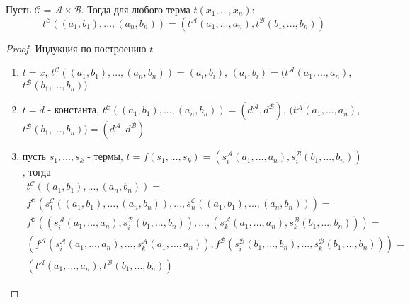 \documentclass[../main/document.tex]{subfiles}
\begin{document}
\begin{lemma}
Пусть $\mathcal{C}= \mathcal{A}\times\mathcal{B}$. Тогда для любого терма $t(x_1,...,x_n)$:
$$t^{\mathcal{C}}((a_1,b_1),...,(a_n,b_n))=(t^{\mathcal{A}}(a_1,...,a_n),t^{\mathcal{B}}(b_1,...,b_n))$$
\begin{proof}
Индукция по построению $t$
\begin{enumerate}
\item $t=x$, $t^{\mathcal{C}}((a_1,b_1),...,(a_n,b_n))=(a_i,b_i)$, $(a_i,b_i)=(t^{\mathcal{A}}(a_1,...,a_n)$, $t^{\mathcal{B}}(b_1,...,b_n))$
\item $t=d$ - константа, $t^{\mathcal{C}}((a_1,b_1),...,(a_n,b_n))=(d^{\mathcal{A}},d^{\mathcal{B}})$, $(t^{\mathcal{A}}(a_1,...,a_n)$, $t^{\mathcal{B}}(b_1,...,b_n))=(d^{\mathcal{A}},d^{\mathcal{B}})$
\item пусть $s_1,...,s_k$ - термы, $t=f(s_1,...,s_k)=(s_i^{\mathcal{A}}(a_1,...,a_n),s_i^{\mathcal{B}}(b_1,...,b_n))$, тогда
\begin{multline*}
t^{\mathcal{C}}((a_1,b_1),...,(a_n,b_n))=\\
f^{\mathcal{C}}(s_1^{\mathcal{C}}((a_1,b_1),...,(a_n,b_n)),...,s_n^{\mathcal{C}}((a_1,b_1),...,(a_n,b_n)))=\\
f^{\mathcal{C}}((s_i^{\mathcal{A}}(a_1,...,a_n),s_i^{\mathcal{B}}(b_1,...,b_n)),...,(s_k^{\mathcal{A}}(a_1,...,a_n),s_k^{\mathcal{B}}(b_1,...,b_n)))=\\
(f^{\mathcal{A}}(s_i^{\mathcal{A}}(a_1,...,a_n),...,s_k^{\mathcal{A}}(a_1,...,a_n)),f^{\mathcal{B}}(s_i^{\mathcal{B}}(b_1,...,b_n),...,s_k^{\mathcal{B}}(b_1,...,b_n)))=\\
(t^{\mathcal{A}}(a_1,...,a_n),t^{\mathcal{B}}(b_1,...,b_n))
\end{multline*}

\end{enumerate}
\end{proof}
\end{lemma}
\end{document}
